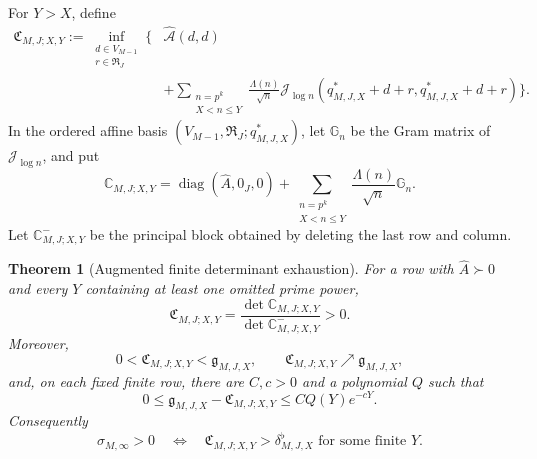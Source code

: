 \documentclass[11pt]{amsart}
\newtheorem{theorem}{Theorem}[section]
\theoremstyle{definition}
\theoremstyle{remark}
\begin{document}
For \(Y>X\), define
\[
\begin{aligned}
 \mathfrak C_{M,J;X,Y}:=
 \inf_{\substack{d\in V_{M-1}\\r\in\mathfrak R_J}}
 \bigg\{&\widehat{\mathcal A}(d,d)\\
 &+\sum_{\substack{n=p^k\\X<n\le Y}}
 \frac{\Lambda(n)}{\sqrt n}
 \mathcal J_{\log n}(q_{M,J,X}^*+d+r,q_{M,J,X}^*+d+r)
 \bigg\}.
\end{aligned}
\tag{9.25ag}
\]
In the ordered affine basis
\((V_{M-1},\mathfrak R_J;q_{M,J,X}^*)\), let
\(\mathbb G_n\) be the Gram matrix of \(\mathcal J_{\log n}\), and put
\[
 \mathbb C_{M,J;X,Y}
 =\operatorname{diag}(\widehat A,0_J,0)
 +\sum_{\substack{n=p^k\\X<n\le Y}}
 \frac{\Lambda(n)}{\sqrt n}\mathbb G_n.
\tag{9.25ah}
\]
Let \(\mathbb C_{M,J;X,Y}^{-}\) be the principal block obtained by
deleting the last row and column.

\begin{theorem}[Augmented finite determinant exhaustion]
\label{thm:augmented-exhaustion}
For a row with \(\widehat A\succ0\) and every \(Y\) containing at least one omitted prime power,
\[
 \boxed{
 \mathfrak C_{M,J;X,Y}
 =\frac{\det\mathbb C_{M,J;X,Y}}
        {\det\mathbb C_{M,J;X,Y}^{-}}>0.}
\tag{9.25ai}
\]
Moreover,
\[
 \boxed{
 0<\mathfrak C_{M,J;X,Y}<\mathfrak g_{M,J,X},\qquad
 \mathfrak C_{M,J;X,Y}\nearrow\mathfrak g_{M,J,X},}
\tag{9.25aj}
\]
and, on each fixed finite row, there are \(C,c>0\) and a polynomial
\(Q\) such that
\[
 0\le\mathfrak g_{M,J,X}-\mathfrak C_{M,J;X,Y}
 \le C Q(Y)e^{-cY}.
\tag{9.25ak}
\]
Consequently
\[
 \boxed{
 \sigma_{M,\infty}>0
 \quad\Longleftrightarrow\quad
 \mathfrak C_{M,J;X,Y}>\delta^{\flat}_{M,J,X}
 \text{ for some finite }Y.}
\tag{9.25al}
\]
\end{theorem}
\end{document}
